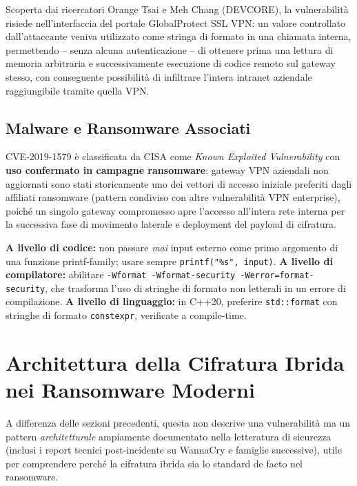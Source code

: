 \documentclass[11pt,a4paper]{article}
\begin{document}
Scoperta dai ricercatori Orange Tsai e Meh Chang (DEVCORE), la vulnerabilità risiede nell'interfaccia del portale GlobalProtect SSL VPN: un valore controllato dall'attaccante veniva utilizzato come stringa di formato in una chiamata interna, permettendo -- senza alcuna autenticazione -- di ottenere prima una lettura di memoria arbitraria e successivamente esecuzione di codice remoto sul gateway stesso, con conseguente possibilità di infiltrare l'intera intranet aziendale raggiungibile tramite quella VPN.

\subsection{Malware e Ransomware Associati}

CVE-2019-1579 è classificata da CISA come \textit{Known Exploited Vulnerability} con \textbf{uso confermato in campagne ransomware}: gateway VPN aziendali non aggiornati sono stati storicamente uno dei vettori di accesso iniziale preferiti dagli affiliati ransomware (pattern condiviso con altre vulnerabilità VPN enterprise), poiché un singolo gateway compromesso apre l'accesso all'intera rete interna per la successiva fase di movimento laterale e deployment del payload di cifratura.

\begin{mitigationbox}
\textbf{A livello di codice:} non passare \emph{mai} input esterno come primo argomento di una funzione printf-family; usare sempre \texttt{printf("\%s", input)}. \textbf{A livello di compilatore:} abilitare \texttt{-Wformat -Wformat-security -Werror=format-security}, che trasforma l'uso di stringhe di formato non letterali in un errore di compilazione. \textbf{A livello di linguaggio:} in C++20, preferire \texttt{std::format} con stringhe di formato \texttt{constexpr}, verificate a compile-time.
\end{mitigationbox}

\section{Architettura della Cifratura Ibrida nei Ransomware Moderni}

A differenza delle sezioni precedenti, questa non descrive una vulnerabilità ma un pattern \emph{architetturale} ampiamente documentato nella letteratura di sicurezza (inclusi i report tecnici post-incidente su WannaCry e famiglie successive), utile per comprendere perché la cifratura ibrida sia lo standard de facto nel ransomware.
\end{document}
